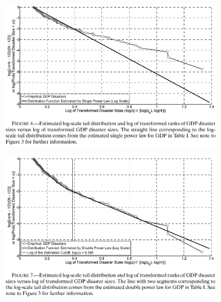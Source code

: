 \documentclass{beamer}
\begin{document}
\begin{frame}
  \begin{figure}
    \includegraphics{barro_jin3.eps}
  \end{figure}
\end{frame}

\begin{frame}
  \begin{figure}
    \includegraphics{barro_jin4.eps}
  \end{figure}
\end{frame}

\end{document}
